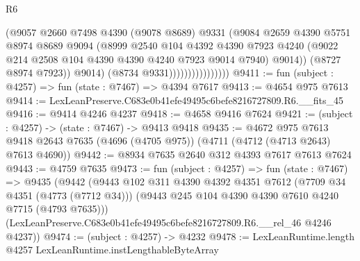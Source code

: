 \begin{lexlean}{R6}
\begin{coremodule}
                                    (@9057
                                      @2660
                                      @7498
                                      @4390
                                      (@9078 @8689)
                                      @9331
                                      (@9084
                                        @2659
                                        @4390
                                        @5751
                                        @8974
                                        @8689
                                        @9094
                                        (@8999
                                          @2540
                                          @104
                                          @4392
                                          @4390
                                          @7923
                                          @4240
                                          (@9022
                                            @214
                                            @2508
                                            @104
                                            @4390
                                            @4390
                                            @4240
                                            @7923
                                            @9014
                                            @7940)
                                          @9014))
                                      (@8727 @8974 @7923))
                                    @9014)
                                  (@8734 @9331))))))))))))))))
@9411 := fun (subject : @4257) => fun (state : @7467) => @4394 @7617
@9413 := @4654 @975 @7613
@9414 := LexLeanPreserve.C683e0b41efe49495c6befe8216727809.R6.__fits_45
@9416 := @9414 @4246 @4237
@9418 := @4658 @9416 @7624
@9421 := (subject : @4257) -> (state : @7467) -> @9413 @9418
@9435 := @4672
    @975
    @7613
    @9418
    @2643
    @7635
    (@4696 (@4705 @975))
    (@4711 (@4712 (@4713 @2643) @7613 @4690))
@9442 := @8934 @7635 @2640 @312 @4393 @7617 @7613 @7624
@9443 := @4759 @7635
@9473 := fun (subject : @4257) =>
  fun (state : @7467) =>
  @9435
    (@9442
      (@9443
        @102
        @311
        @4390
        @4392
        @4351
        @7612
        (@7709 @34 @4351 (@4773 (@7712 @34)))
        (@9443 @245 @104 @4390 @4390 @7610 @4240 @7715 (@4793 @7635)))
      (LexLeanPreserve.C683e0b41efe49495c6befe8216727809.R6.__rel_46 @4246 @4237))
@9474 := (subject : @4257) -> @4232
@9478 := LexLeanRuntime.length @4257 LexLeanRuntime.instLengthableByteArray

\end{coremodule}
\end{lexlean}
